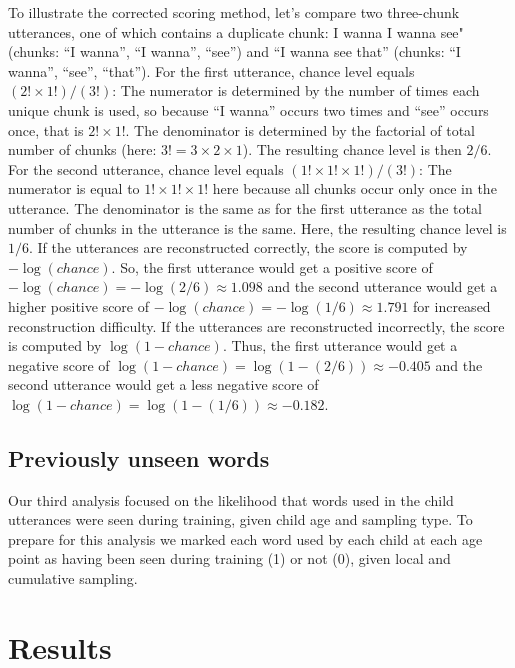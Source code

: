 \documentclass[
  english,
  man,mask,floatsintext]{apa6}
\begin{document}
To illustrate the corrected scoring method, let's compare two three-chunk utterances, one of which contains a duplicate chunk: I wanna I wanna see" (chunks: \enquote{I wanna}, \enquote{I wanna}, \enquote{see}) and \enquote{I wanna see that} (chunks: \enquote{I wanna}, \enquote{see}, \enquote{that}). For the first utterance, chance level equals \((2!\times1!)/(3!)\): The numerator is determined by the number of times each unique chunk is used, so because \enquote{I wanna} occurs two times and \enquote{see} occurs once, that is \(2!\times1!\). The denominator is determined by the factorial of total number of chunks (here: \(3! = 3\times2\times1\)). The resulting chance level is then \(2/6\). For the second utterance, chance level equals \((1!\times1!\times1!)/(3!)\): The numerator is equal to \(1!\times1!\times1!\) here because all chunks occur only once in the utterance. The denominator is the same as for the first utterance as the total number of chunks in the utterance is the same. Here, the resulting chance level is \(1/6\). If the utterances are reconstructed correctly, the score is computed by \(-\log(chance)\). So, the first utterance would get a positive score of \(-\log(chance) = -\log(2/6) \approx 1.098\) and the second utterance would get a higher positive score of \(-\log(chance) = -\log(1/6) \approx 1.791\) for increased reconstruction difficulty. If the utterances are reconstructed incorrectly, the score is computed by \(\log(1-chance)\). Thus, the first utterance would get a negative score of \(\log(1-chance) = \log(1-(2/6)) \approx -0.405\) and the second utterance would get a less negative score of \(\log(1-chance) = \log(1-(1/6)) \approx -0.182\).

\hypertarget{previously-unseen-words}{%
\subsection{Previously unseen words}\label{previously-unseen-words}}

Our third analysis focused on the likelihood that words used in the child utterances were seen during training, given child age and sampling type. To prepare for this analysis we marked each word used by each child at each age point as having been seen during training (1) or not (0), given local and cumulative sampling.

\hypertarget{results}{%
\section{Results}\label{results}}
\end{document}
